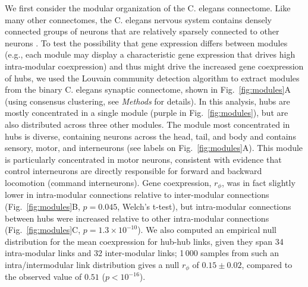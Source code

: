 \documentclass[10pt,letterpaper]{article}
\begin{document}

We first consider the modular organization of the C. elegans connectome.
Like many other connectomes, the C. elegans nervous system contains densely connected groups of neurons that are relatively sparsely connected to other neurons \cite{Kim2014, Bassett2010, Pavlovic2014}.
To test the possibility that gene expression differs between modules (e.g., each module may display a characteristic gene expression that drives high intra-modular coexpression) and thus might drive the increased gene coexpression of hubs, we used the Louvain community detection algorithm to extract modules from the binary C. elegans synaptic connectome, shown in Fig.~\ref{fig:modules}A (using consensus clustering, see \textit{Methods} for details).
In this analysis, hubs are mostly concentrated in a single module (purple in Fig.~\ref{fig:modules}), but are also distributed across three other modules.
The module most concentrated in hubs is diverse, containing neurons across the head, tail, and body and contains sensory, motor, and interneurons (see labels on Fig.~\ref{fig:modules}A).
This module is particularly concentrated in motor neurons, consistent with evidence that control interneurons are directly responsible for forward and backward locomotion (command interneurons).
Gene coexpression, $r_\phi$, was in fact slightly lower in intra-modular connections relative to inter-modular connections (Fig.~\ref{fig:modules}B, $p = 0.045$, Welch's t-test), but intra-modular connections between hubs were increased relative to other intra-modular connections (Fig.~\ref{fig:modules}C, $p = 1.3\times 10^{-10}$).
We also computed an empirical null distribution for the mean coexpression for hub-hub links, given they span 34 intra-modular links and 32 inter-modular links; 1\,000 samples from such an intra/intermodular link distribution gives a null $r_\phi$ of $0.15 \pm 0.02$, compared to the observed value of $0.51$ ($p < 10^{-16}$).
\end{document}
